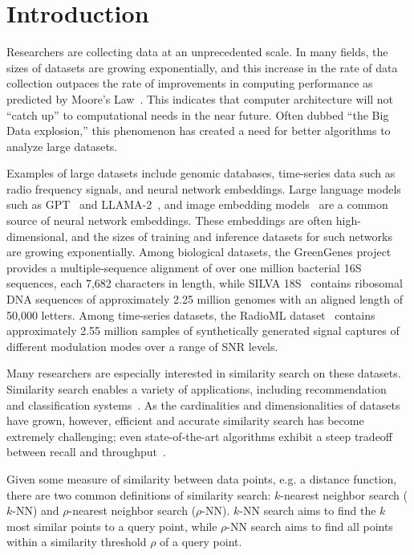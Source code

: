 \section{Introduction}
\label{sec:introduction}

Researchers are collecting data at an unprecedented scale.
In many fields, the sizes of datasets are growing exponentially, and this increase in the rate of data collection outpaces the rate of improvements in computing performance as predicted by Moore's Law~\cite{kahn2011future}.
This indicates that computer architecture will not ``catch up'' to computational needs in the near future.
Often dubbed ``the Big Data explosion,'' this phenomenon has created a need for better algorithms to analyze large datasets.

Examples of large datasets include genomic databases, time-series data such as radio frequency signals, and neural network embeddings.
Large language models such as GPT~\cite{2020arXiv200514165B, OpenAI2023GPT4TR} and LLAMA-2~\cite{Touvron2023Llama2O}, and image embedding models~\cite{radford2021learning, dosovitskiy2020image} are a common source of neural network embeddings.
These embeddings are often high-dimensional, and the sizes of training and inference datasets for such networks are growing exponentially.
Among biological datasets, the GreenGenes project~\cite{desantis2006greengenes} provides a multiple-sequence alignment of over one million bacterial 16S sequences, each 7,682 characters in length, while SILVA 18S~\cite{10.1093/nar/gks1219} contains ribosomal DNA sequences of approximately 2.25 million genomes with an aligned length of 50,000 letters.
Among time-series datasets, the RadioML dataset~\cite{oshea2018radioml} contains approximately 2.55 million samples of synthetically generated signal captures of different modulation modes over a range of SNR levels.

Many researchers are especially interested in similarity search on these datasets. 
Similarity search enables a variety of applications, including recommendation~\cite{annoy} and classification systems~\cite{suyanto2022knnclassifier}. 
As the cardinalities and dimensionalities of datasets have grown, however, efficient and accurate similarity search has become extremely challenging; 
even state-of-the-art algorithms exhibit a steep tradeoff between recall and throughput~\cite{Malkov2016EfficientAR, johnson2019billion, annoy, aumuller2020ann}.

Given some measure of similarity between data points, e.g. a distance function, there are two common definitions of similarity search: $k$-nearest neighbor search ($k$-NN) and $\rho$-nearest neighbor search ($\rho$-NN).
$k$-NN search aims to find the $k$ most similar points to a query point, while $\rho$-NN search aims to find all points within a similarity threshold $\rho$ of a query point.

